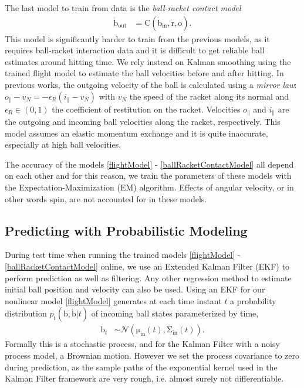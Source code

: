 \documentclass[letterpaper, 10 pt, conference]{ieeeconf}
\newcommand{\boldvec}[1]{\boldsymbol{\mathrm{#1}}}
\let\vec\boldvec
\newcommand{\ball}{\vec{b}} %
\newcommand{\contact}{\vec{C}} %
\newcommand{\racket}{\vec{r}} %
\newcommand{\orient}{\vec{o}} %
\begin{document}
The last model to train from data is the \emph{ball-racket contact model} 
%
\begin{align}
\dot{\ball}_{\mathrm{out}} &= \contact(\dot{\ball}_{\mathrm{in}},\dot{\racket},\orient).
\label{ballRacketContactModel}
\end{align}
%
\noindent This model is significantly harder to train from the previous models, as it requires ball-racket interaction data and it is difficult to get reliable ball estimates around hitting time. We rely instead on Kalman smoothing using the trained flight model to estimate the ball velocities before and after hitting. In previous works, the outgoing velocity of the ball is calculated using a \emph{mirror law}: $o_{\parallel} - v_N = -\epsilon_{R} (i_{\parallel} - v_N)$ with $v_N$ the speed of the racket along its normal and $\epsilon_{R} \in (0,1)$ the coefficient of restitution on the racket. Velocities $o_{\parallel}$ and $i_{\parallel}$ are the outgoing and incoming ball velocities along the racket, respectively. This model assumes an elastic momentum exchange and it is quite inaccurate, especially at high ball velocities.

The accuracy of the models \eqref{flightModel} - \eqref{ballRacketContactModel} all depend on each other and for this reason, we train the parameters of these models with the Expectation-Maximization (EM) algorithm. Effects of angular velocity, or in other words spin, are not accounted for in these models.

\subsection{Predicting with Probabilistic Modeling}
 
During test time when running the trained models \eqref{flightModel} - \eqref{ballRacketContactModel} online, we use an Extended Kalman Filter (EKF) to perform prediction as well as filtering. Any other regression method to estimate initial ball position and velocity can also be used.
Using an EKF for our nonlinear model \eqref{flightModel} generates at each time instant $t$ a probability distribution $p_t(\ball,\dot{\ball}|t)$ of incoming ball states parameterized by time, 
%
\begin{align}
\ball_t &\sim \mathcal{N}(\vec{\mu}_{\textrm{in}}(t),\vec{\Sigma}_{\textrm{in}}(t)). 
\end{align}
%
%
\noindent Formally this is a stochastic process, and for the Kalman Filter with a noisy process model, a Brownian motion. However we set the process covariance to zero during prediction, as the sample paths of the exponential kernel used in the Kalman Filter framework are very rough, i.e. almost surely not differentiable.
\end{document}
